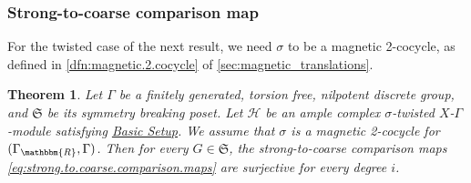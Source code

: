 \documentclass{amsart}
\numberwithin{figure}{section}
\numberwithin{equation}{section}
\numberwithin{table}{section}
\theoremstyle{plain}
\newtheorem{theorem}[equation]{Theorem}
\theoremstyle{definition}
\theoremstyle{remark}
\theoremstyle{nonumber}
\newcommand{\refbasicsetup}{\hyperref[basic_setup]{Basic Setup}}
\newcommand{\R}{\mathbb{R}}
\renewcommand{\mathbb}{\mathbbm} %
\begin{document}
\subsubsection{Strong-to-coarse comparison map}\label{sec:comparison.strong.coarse}

For the twisted case of the next result, we need $\sigma$ to be a magnetic
2-cocycle, as defined in \cref{dfn:magnetic.2.cocycle} of
\cref{sec:magnetic_translations}.

\begin{theorem}\label{thm:existence_strong_phase}
Let \( \Gamma \) be a finitely generated, torsion
free, nilpotent discrete group, and \( \mathfrak{S} \) be its symmetry breaking poset. 
Let \( \mathcal{H} \) be an ample complex $\sigma$-twisted \( X \)-\(
\Gamma \)-module satisfying \refbasicsetup. 
We assume that $\sigma$ is a magnetic 2-cocycle for $(\Gamma_\R,\Gamma)$.
Then for every \( G\in\mathfrak{S} \), 
the strong-to-coarse comparison maps
\eqref{eq:strong.to.coarse.comparison.maps} are surjective for every degree \( i \).
\end{theorem}
\end{document}

